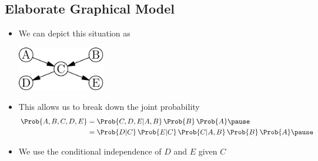 
\begin{slide}
\section{Elaborate Graphical Model}
  
\begin{PauseHighLight}
  \begin{itemize}
  \item We can depict this situation as
    \begin{center}
      \includegraphics[width=0.3\textwidth]{figures/abcde_g.pdf}\pause
    \end{center}
  \item This allows us to break down the joint probability
    \begin{align*}
      \Prob{A,B,C,D,E} &= \Prob{C,D,E|A,B}\,\Prob{B}\,\Prob{A} \pause\\
                       &= \Prob{D|C}\,\Prob{E|C}\,
                         \Prob{C|A,B}\,\Prob{B}\,\Prob{A} \pause
    \end{align*}
  \item We use the conditional independence of $D$ and $E$ given $C$\pause
  \end{itemize}
\end{PauseHighLight}

\end{slide}


